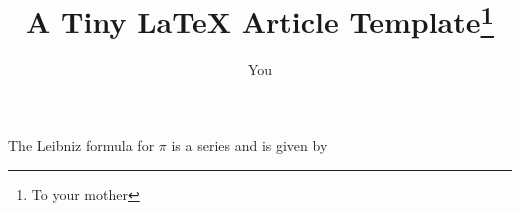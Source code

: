 \documentclass{article}
\title{A Tiny \LaTeX{} Article Template\thanks{To your mother}}
\author{You}
\begin{document}
\maketitle

The Leibniz formula for $\pi$ is a series and is given by


\end{document}
